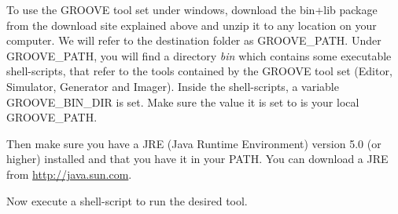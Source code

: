 To use the GROOVE tool set under windows, download the bin+lib package from the
download site explained above and unzip it to any location on your computer. We
will refer to the destination folder as GROOVE\_PATH. Under GROOVE\_PATH, you
will find a directory \emph{bin} which contains some executable shell-scripts,
that refer to the tools contained by the GROOVE tool set (Editor, Simulator,
Generator and Imager). Inside the shell-scripts, a variable GROOVE\_BIN\_DIR is
set. Make sure the value it is set to is your local GROOVE\_PATH.

Then make sure you have a JRE (Java Runtime Environment) version 5.0 (or
higher) installed and that you have it in your PATH. You can download a JRE
from \url{http://java.sun.com}.

Now execute a shell-script to run the desired tool.
